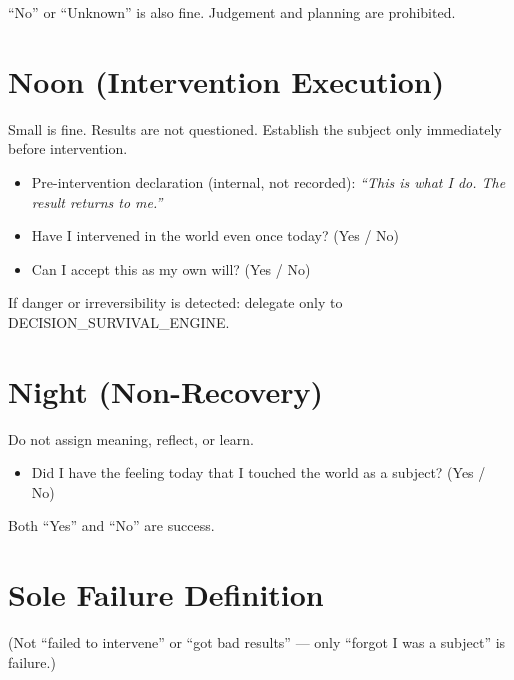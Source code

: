 \noindent
``No'' or ``Unknown'' is also fine. Judgement and planning are
prohibited.

\section{Noon (Intervention Execution)}
\label{sec:life-sop-noon}

Small is fine. Results are not questioned. Establish the subject
only immediately before intervention.

\begin{itemize}
\item[$\square$] Pre-intervention declaration (internal, not
recorded): \textit{``This is what I do. The result returns to me.''}
\item[$\square$] Have I intervened in the world even once today?
(Yes / No)
\item[$\square$] Can I accept this as my own will? (Yes / No)
\end{itemize}

\noindent
If danger or irreversibility is detected: delegate only to
DECISION\_SURVIVAL\_ENGINE.

\section{Night (Non-Recovery)}
\label{sec:life-sop-night}

Do not assign meaning, reflect, or learn.

\begin{itemize}
\item[$\square$] Did I have the feeling today that I touched the
world as a subject? (Yes / No)
\end{itemize}

\noindent
Both ``Yes'' and ``No'' are success.

\section{Sole Failure Definition}
\label{sec:life-sop-failure}


\noindent
(Not ``failed to intervene'' or ``got bad results'' --- only
``forgot I was a subject'' is failure.)

